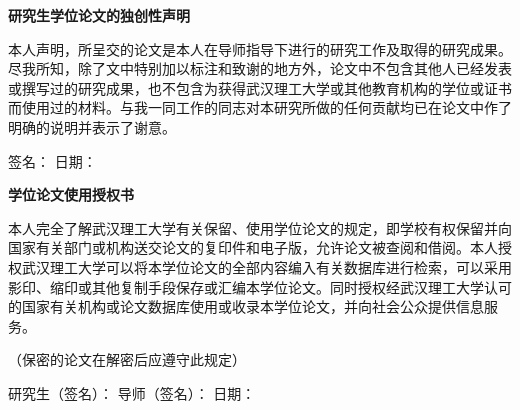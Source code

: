 \begin{titlepage}
\begin{center}
\heiti\textbf{研究生学位论文的独创性声明}
\end{center}
\vspace{5mm}

{
\STZhongsong
\setlength{\baselineskip}{28pt}
\par 本人声明，所呈交的论文是本人在导师指导下进行的研究工作及取得的研究成果。尽我所知，除了文中特别加以标注和致谢的地方外，论文中不包含其他人已经发表或撰写过的研究成果，也不包含为获得武汉理工大学或其他教育机构的学位或证书而使用过的材料。与我一同工作的同志对本研究所做的任何贡献均已在论文中作了明确的说明并表示了谢意。\par
}

\vspace{3mm}
\par {\STZhongsong 签\hspace{3mm}名：} {\makebox[30mm]{}} \hspace{8mm} {\STZhongsong 日\hspace{3mm}期：} {\makebox[30mm]{}}

\vspace{20mm}

\begin{center}
\heiti\textbf{学位论文使用授权书}
\end{center}
\vspace{3mm}

{
\STZhongsong
\setlength{\baselineskip}{28pt}
\par 本人完全了解武汉理工大学有关保留、使用学位论文的规定，即学校有权保留并向国家有关部门或机构送交论文的复印件和电子版，允许论文被查阅和借阅。本人授权武汉理工大学可以将本学位论文的全部内容编入有关数据库进行检索，可以采用影印、缩印或其他复制手段保存或汇编本学位论文。同时授权经武汉理工大学认可的国家有关机构或论文数据库使用或收录本学位论文，并向社会公众提供信息服务。\par
}

\vspace{3mm}
\par {\STZhongsong（保密的论文在解密后应遵守此规定）}

\vspace{20mm}
\par {\STZhongsong 研究生（签名）：} \hspace{20mm} {\STZhongsong 导师（签名）：} \hspace{20mm} {\STZhongsong 日期：}
\end{titlepage}

